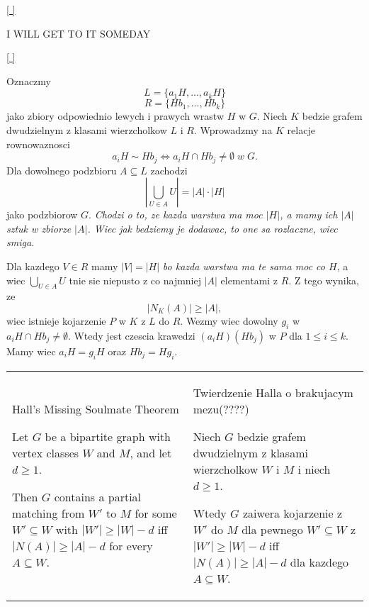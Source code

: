 \medskip

\hyperref[cosets-graphs-LAN]{[ ]}
\label{cosets-graphs-GB}
\medskip

{\color{cyan}I WILL GET TO IT SOMEDAY}

\hyperref[cosets-graphs-LAN]{[ ]}
\label{cosets-graphs-PL}
\medskip

Oznaczmy
$$L=\{a_1H,...,a_kH\}$$
$$R=\{Hb_1,...,Hb_k\}$$
jako zbiory odpowiednio lewych i prawych wrastw $H$ w $G$. Niech $K$ bedzie grafem dwudzielnym z klasami wierzcholkow $L$ i $R$. Wprowadzmy na $K$ relacje rownowaznosci
$$a_iH\sim Hb_j\iff a_iH\cap Hb_j\neq\emptyset\;w\;G.$$
Dla dowolnego podzbioru $A\subseteq L$ zachodzi
$$|\bigcup\limits_{U\in A}U|=|A|\cdot|H|$$
jako podzbiorow $G$. \emph{\color{dyg}Chodzi o to, ze kazda warstwa ma moc $|H|$, a mamy ich $|A|$ sztuk w zbiorze $|A|$. Wiec jak bedziemy je dodawac, to one sa rozlaczne, wiec smiga.}

Dla kazdego $V\in R$ mamy $|V|=|H|$ \emph{\color{dyg}bo kazda warstwa ma te sama moc co $H$}, a wiec $\bigcup_{U\in A} U$ tnie sie niepusto z co najmniej $|A|$ elementami z $R$. Z tego wynika, ze
$$|N_K(A)|\geq |A|,$$
wiec istnieje kojarzenie $P$ w $K$ z $L$ do $R$. Wezmy wiec dowolny $g_i$ w $a_iH\cap Hb_j\neq\emptyset$. Wtedy jest czescia krawedzi $(a_iH)(Hb_j)$ w $P$ dla $1\leq i\leq k$. Mamy wiec $a_iH=g_iH$ oraz $Hb_j=Hg_i$.
\bigskip

\bigskip

\begin{tabularx}{\textwidth}{ X!{\color{git90gray}\vrule} X}
    {\color{def}Hall's Missing Soulmate Theorem}

    Let $G$ be a bipartite graph with vertex classes $W$ and $M$, and let $d\geq1$. 
    
    Then $G$ contains a partial matching from $W'$ to $M$ for some $W'\subseteq W$ with $|W'|\geq|W|-d$ iff $|N(A)|\geq|A|-d$ for every $A\subseteq W$. 

    &

    {\color{def}Twierdzenie Halla o brakujacym mezu(????)}

    Niech $G$ bedzie grafem dwudzielnym z klasami wierzcholkow $W$ i $M$ i niech $d\geq1$. 
    
    Wtedy $G$ zaiwera kojarzenie z $W'$ do $M$ dla pewnego $W'\subseteq W$ z $|W'|\geq|W|-d$ iff $|N(A)|\geq|A|-d$ dla kazdego $A\subseteq W$.

\end{tabularx}

